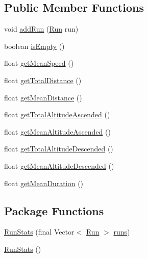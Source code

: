 \subsection*{Public Member Functions}
\begin{DoxyCompactItemize}
\item 
void \mbox{\hyperlink{classcom_1_1activitytracker_1_1_run_stats_a1b00f177e7c4abc155bb03c6a8b5d7dd}{add\+Run}} (\mbox{\hyperlink{classcom_1_1activitytracker_1_1_run}{Run}} run)
\item 
boolean \mbox{\hyperlink{classcom_1_1activitytracker_1_1_run_stats_a91d1d4302548cc114a1f1b63a47fcc1d}{is\+Empty}} ()
\item 
float \mbox{\hyperlink{classcom_1_1activitytracker_1_1_run_stats_abb92798a7b1ff95b3b458f9bbd3b2fb8}{get\+Mean\+Speed}} ()
\item 
float \mbox{\hyperlink{classcom_1_1activitytracker_1_1_run_stats_abdaa7bc971293da224da08e6a6b3bd4c}{get\+Total\+Distance}} ()
\item 
float \mbox{\hyperlink{classcom_1_1activitytracker_1_1_run_stats_a28d7e9769b52fd45351a07c9d2e435f2}{get\+Mean\+Distance}} ()
\item 
float \mbox{\hyperlink{classcom_1_1activitytracker_1_1_run_stats_aefa553b9c74ef8f2fd82204b9b2e70d2}{get\+Total\+Altitude\+Ascended}} ()
\item 
float \mbox{\hyperlink{classcom_1_1activitytracker_1_1_run_stats_af54051bc8ab944056f90af25d55ac646}{get\+Mean\+Altitude\+Ascended}} ()
\item 
float \mbox{\hyperlink{classcom_1_1activitytracker_1_1_run_stats_a1d0f5d2353a797e1e2dea3c96472e6d8}{get\+Total\+Altitude\+Descended}} ()
\item 
float \mbox{\hyperlink{classcom_1_1activitytracker_1_1_run_stats_a6f7829790dae6f302fe4cd218fc6b21f}{get\+Mean\+Altitude\+Descended}} ()
\item 
float \mbox{\hyperlink{classcom_1_1activitytracker_1_1_run_stats_a7d929e97a9d760b4577529bcab71cdf7}{get\+Mean\+Duration}} ()
\end{DoxyCompactItemize}
\subsection*{Package Functions}
\begin{DoxyCompactItemize}
\item 
\mbox{\hyperlink{classcom_1_1activitytracker_1_1_run_stats_a9c29c9a218ea2b01cfa42787b3c85f7c}{Run\+Stats}} (final Vector$<$ \mbox{\hyperlink{classcom_1_1activitytracker_1_1_run}{Run}} $>$ \mbox{\hyperlink{classcom_1_1activitytracker_1_1_run_stats_a0fd429e9f463ddf4897c507c0e3c0a12}{runs}})
\item 
\mbox{\hyperlink{classcom_1_1activitytracker_1_1_run_stats_a851891349994df7dcfd7bb599c413e35}{Run\+Stats}} ()
\end{DoxyCompactItemize}
